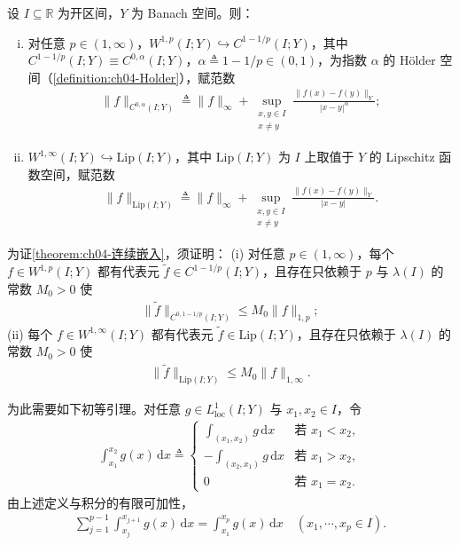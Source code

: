 \documentclass[../../main.tex]{subfiles}%
\begin{document}
\begin{theorem}\label{theorem:ch04-连续嵌入}
设 $I\subseteq\mathbb{R}$ 为开区间，$Y$ 为 Banach 空间。则：
\begin{enumerate}[(i)]
\item\label{item:ch04-连续嵌入-i} 对任意 $p\in(1,\infty)$，$W^{1,p}(I;Y)\hookrightarrow C^{1-1/p}(I;Y)$，其中 $C^{1-1/p}(I;Y)\equiv C^{0,\alpha}(I;Y)$，$\alpha\triangleq1-1/p\in(0,1)$，为指数 $\alpha$ 的 Hölder 空间（\cref{definition:ch04-Holder}），赋范数
\begin{align*}
\|f\|_{C^{0,\alpha}(I;Y)}\triangleq\|f\|_\infty+\sup_{\substack{x,y\in I\\x\neq y}}\frac{\|f(x)-f(y)\|_Y}{|x-y|^\alpha};
\end{align*}
\item\label{item:ch04-连续嵌入-ii} $W^{1,\infty}(I;Y)\hookrightarrow\mathrm{Lip}(I;Y)$，其中 $\mathrm{Lip}(I;Y)$ 为 $I$ 上取值于 $Y$ 的 Lipschitz 函数空间，赋范数
\begin{align*}
\|f\|_{\mathrm{Lip}(I;Y)}\triangleq\|f\|_\infty+\sup_{\substack{x,y\in I\\x\neq y}}\frac{\|f(x)-f(y)\|_Y}{|x-y|}.
\end{align*}
\end{enumerate}
\end{theorem}

为证\cref{theorem:ch04-连续嵌入}，须证明：
(i) 对任意 $p\in(1,\infty)$，每个 $f\in W^{1,p}(I;Y)$ 都有代表元 $\tilde f\in C^{1-1/p}(I;Y)$，且存在只依赖于 $p$ 与 $\lambda(I)$ 的常数 $M_0>0$ 使
\begin{align}
\|\tilde f\|_{C^{0,1-1/p}(I;Y)}\leqslant M_0\|f\|_{1,p}; \label{align:ch04-4.130a}
\end{align}
(ii) 每个 $f\in W^{1,\infty}(I;Y)$ 都有代表元 $\tilde f\in\mathrm{Lip}(I;Y)$，且存在只依赖于 $\lambda(I)$ 的常数 $M_0>0$ 使
\begin{align}
\|\tilde f\|_{\mathrm{Lip}(I;Y)}\leqslant M_0\|f\|_{1,\infty}. \label{align:ch04-4.130b}
\end{align}

为此需要如下初等引理。对任意 $g\in L^1_{\mathrm{loc}}(I;Y)$ 与 $x_1,x_2\in I$，令
\begin{align*}
\int_{x_1}^{x_2}g(x)\,\mathrm{d}x\triangleq
\begin{cases}
\int_{(x_1,x_2)}g\,\mathrm{d}x & \text{若 }x_1<x_2,\\
-\int_{(x_2,x_1)}g\,\mathrm{d}x & \text{若 }x_1>x_2,\\
0 & \text{若 }x_1=x_2.
\end{cases}
\end{align*}
由上述定义与积分的有限可加性，
\begin{align}
\sum_{j=1}^{p-1}\int_{x_j}^{x_{j+1}}g(x)\,\mathrm{d}x=\int_{x_1}^{x_p}g(x)\,\mathrm{d}x\quad(x_1,\cdots ,x_p\in I). \label{align:ch04-4.131}
\end{align}
\end{document}
